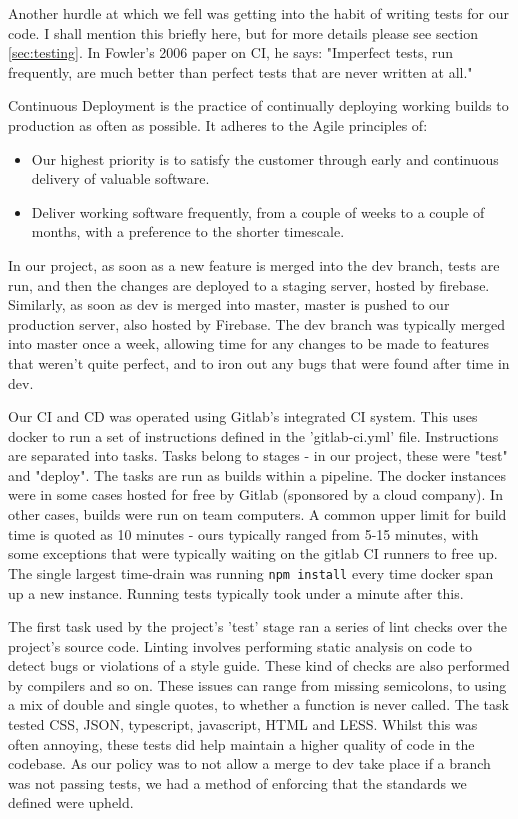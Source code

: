 \documentclass{l3proj}
\begin{document}
Another hurdle at which we fell was getting into the habit of writing tests for our code. I shall 
 mention this briefly here, but for more details please see section \ref{sec:testing}. In Fowler's 
 2006 paper on CI, he says: "Imperfect tests, run frequently, are much better than perfect tests 
 that are never written at all."\cite{fowler2006continuous}
 
Continuous Deployment is the practice of continually deploying working builds to production
 as often as possible. It adheres to the Agile principles of:
 \begin{itemize}
 \item
 Our highest priority is to satisfy the customer
 through early and continuous delivery
 of valuable software. \cite{agileprinciples}
 \item 
 Deliver working software frequently, from a 
 couple of weeks to a couple of months, with a 
 preference to the shorter timescale. \cite{agileprinciples}
 \end{itemize}
 In our project, as soon as a new feature is merged into the dev branch,
 tests are run, and then the changes are deployed to a staging server, hosted by firebase. Similarly,
 as soon as dev is merged into master, master is pushed to our production server, also hosted by Firebase.
 The dev branch was typically merged into master once a week, allowing time for any changes to be made 
 to features that weren't quite perfect, and to iron out any bugs that were found after time in dev.
 
Our CI and CD was operated using Gitlab's integrated CI system. This uses docker to
 run a set of instructions defined in the 'gitlab-ci.yml' file.  Instructions are 
 separated into tasks. Tasks belong to stages - in our project, these were
 "test" and "deploy". The tasks are run as builds within a pipeline. The docker instances were
 in some cases hosted for free by Gitlab (sponsored by a cloud company). In other cases,
 builds were run on team computers. A common upper limit for build time is quoted as 
 10 minutes\cite{fowler2006continuous} - ours typically ranged from 5-15 minutes, with some exceptions that were 
 typically waiting on the gitlab CI runners to free up. The single largest time-drain was
 running \texttt{npm install} every time docker span up a new instance. Running tests typically took under
 a minute after this.
 
 


The first task used by the project's 'test' stage ran a series of lint checks over the 
 project's source code. Linting involves performing static analysis on code to detect bugs 
 or violations of a style guide. These kind of checks are also performed by compilers and 
 so on. These issues can range from missing semicolons, to using a mix of 
 double and single quotes, to whether a function is never called. The task tested CSS, 
 JSON, typescript, javascript,  HTML and LESS. Whilst this was often annoying, these tests 
 did help maintain a higher quality of code in the codebase. As our policy was to not allow a 
 merge to dev take place if a branch was not passing tests, we had a method of 
 enforcing that the standards we defined were upheld.
\end{document}
